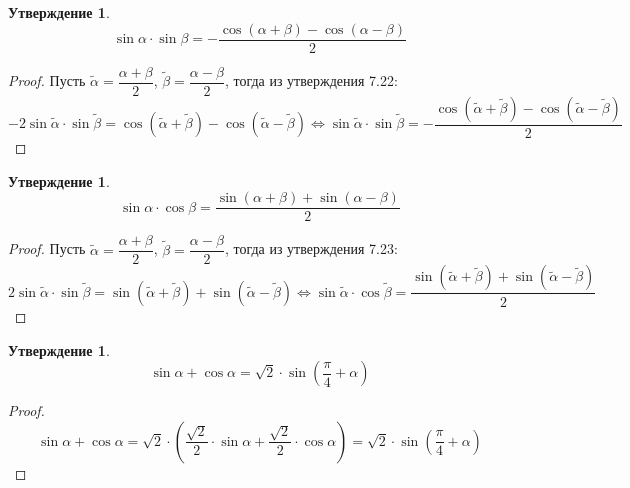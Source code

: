 \documentclass[12pt]{article}
\theoremstyle{definition}
\newtheorem{statement}[theorem]{Утверждение}
\begin{document}
    \begin{statement}
        $$\sin\alpha\cdot\sin\beta=-\dfrac{\cos(\alpha+\beta)-\cos(\alpha-\beta)}{2}$$
    \end{statement}
    \begin{proof}
        Пусть $\tilde{\alpha} = \dfrac{\alpha+\beta}{2}$, $\tilde{\beta} = \dfrac{\alpha-\beta}{2}$, тогда из утверждения 7.22:
        $$-2\sin\tilde{\alpha}\cdot\sin\tilde{\beta}=\cos(\tilde{\alpha}+\tilde{\beta})-\cos(\tilde{\alpha}-\tilde{\beta})\Longleftrightarrow \sin\tilde{\alpha}\cdot\sin\tilde{\beta}=-\dfrac{\cos(\tilde{\alpha}+\tilde{\beta})-\cos(\tilde{\alpha}-\tilde{\beta})}{2}$$
    \end{proof}
    \begin{statement}
        $$\sin\alpha\cdot\cos\beta=\dfrac{\sin(\alpha+\beta)+\sin(\alpha-\beta)}{2}$$
    \end{statement}
    \begin{proof}
        Пусть $\tilde{\alpha} = \dfrac{\alpha+\beta}{2}$, $\tilde{\beta} = \dfrac{\alpha-\beta}{2}$, тогда из утверждения 7.23:
        $$2\sin\tilde{\alpha}\cdot\sin\tilde{\beta}=\sin(\tilde{\alpha}+\tilde{\beta})+\sin(\tilde{\alpha}-\tilde{\beta})\Longleftrightarrow \sin\tilde{\alpha}\cdot\cos\tilde{\beta}=\dfrac{\sin(\tilde{\alpha}+\tilde{\beta})+\sin(\tilde{\alpha}-\tilde{\beta})}{2}$$
    \end{proof}
    \begin{statement}
        $$\sin\alpha+\cos\alpha=\sqrt{2}\cdot\sin\left(\dfrac{\pi}{4}+\alpha\right)$$
    \end{statement}
    \begin{proof}
        $$\sin\alpha+\cos\alpha=\sqrt{2}\cdot\left(\dfrac{\sqrt{2}}{2}\cdot\sin\alpha+\dfrac{\sqrt{2}}{2}\cdot\cos\alpha\right)=\sqrt{2}\cdot\sin\left(\dfrac{\pi}{4}+\alpha\right)$$
    \end{proof}
\end{document}
